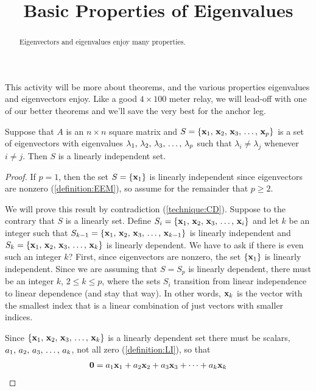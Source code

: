 \documentclass{ximera}
\title{Basic Properties of Eigenvalues}
\begin{document}
\begin{abstract}
  Eigenvectors and eigenvalues enjoy many properties.
\end{abstract}
\maketitle

This activity will be more about theorems, and the various properties
eigenvalues and eigenvectors enjoy.  Like a good
$4\times 100\text{ meter}$ relay, we will lead-off with one of our
better theorems and we'll save the very best for the anchor leg.

\begin{theorem}
\label{theorem:EDELI}

Suppose that $A$ is an $n\times n$ square matrix and
$S=\left\{\mathbf{x}_{1},\,\mathbf{x}_{2},\,\mathbf{x}_{3},\,\ldots,\,\mathbf{x}_{p}\right\}$ is a set of eigenvectors with eigenvalues
${\lambda}_{1},\,{\lambda}_{2},\,{\lambda}_{3},\,\ldots,\,{\lambda}_{p}$ such that $\lambda_i\neq\lambda_j$ whenever
$i\neq j$.  Then $S$ is a linearly independent set.

\begin{proof}
  If $p=1$, then the set $S=\left\{\mathbf{x}_1\right\}$ is linearly independent
  since eigenvectors are nonzero (\ref{definition:EEM}), so assume for
  the remainder that $p\geq 2$.

  We will prove this result by contradiction (\ref{technique:CD}).
  Suppose to the contrary that $S$ is a linearly  set.
  Define $S_i=\left\{\mathbf{x}_{1},\,\mathbf{x}_{2},\,\mathbf{x}_{3},\,\ldots,\,\mathbf{x}_{i}\right\}$ and let $k$ be an integer such
  that $S_{k-1}=\left\{\mathbf{x}_{1},\,\mathbf{x}_{2},\,\mathbf{x}_{3},\,\ldots,\,\mathbf{x}_{k-1}\right\}$ is linearly independent and
  $S_k=\left\{\mathbf{x}_{1},\,\mathbf{x}_{2},\,\mathbf{x}_{3},\,\ldots,\,\mathbf{x}_{k}\right\}$ is linearly dependent.  We have to ask
  if there is even such an integer $k$?  First, since eigenvectors are
  nonzero, the set $\left\{\mathbf{x}_1\right\}$ is linearly independent.  Since
  we are assuming that $S=S_p$ is linearly dependent, there must be an
  integer $k$, $2\leq k\leq p$, where the sets $S_i$ transition from
  linear independence to linear dependence (and stay that way). In
  other words, $\mathbf{x}_k$ is the vector with the smallest index that
  is a linear combination of just vectors with smaller indices.

  Since $\left\{\mathbf{x}_{1},\,\mathbf{x}_{2},\,\mathbf{x}_{3},\,\ldots,\,\mathbf{x}_{k}\right\}$ is a linearly dependent set there
  must be scalars, ${a}_{1},\,{a}_{2},\,{a}_{3},\,\ldots,\,{a}_{k}$, not all zero
  (\ref{definition:LI}), so that
  \begin{align*}
    \mathbf{0}=a_{1}\mathbf{x}_{1}+a_{2}\mathbf{x}_{2}+a_{3}\mathbf{x}_{3}+\cdots +a_{k}\mathbf{x}_{k}
  \end{align*}


\end{proof}
\end{theorem}
\end{document}
